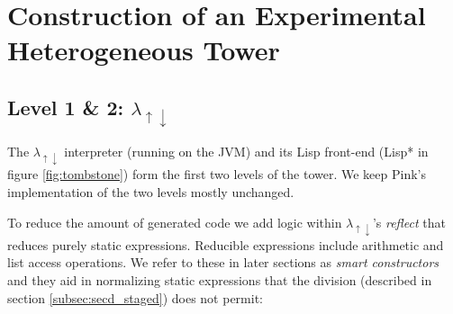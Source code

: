 \documentclass[a4paper,12pt,twoside,openright]{report}
\theoremstyle{definition}
\newcommand{\mslang}{$\lambda_{\uparrow\downarrow}$}
\begin{document}





\newpage
\section{Construction of an Experimental Heterogeneous Tower}\label{sec:tower}
\subsection{Level 1 \& 2: \texorpdfstring{\mslang}{Lg}}\label{sec:mslang}

The \mslang{} interpreter (running on the JVM) and its Lisp front-end (Lisp* in figure \ref{fig:tombstone}) form the first two levels of the tower. We keep Pink's implementation of the two levels mostly unchanged.

To reduce the amount of generated code we add logic within \mslang's \textit{reflect} that reduces purely static expressions. Reducible expressions include arithmetic and list access operations. We refer to these in later sections as \textit{smart constructors} and they aid in normalizing static expressions that the division (described in section \ref{subsec:secd_staged}) does not permit:
\end{document}
